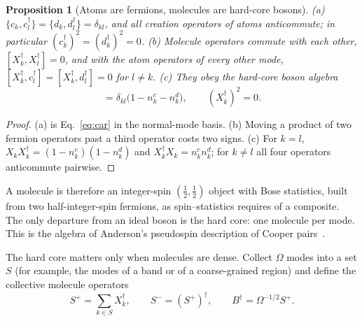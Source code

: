 \documentclass[reprint,aps,prd,amsmath,amssymb,superscriptaddress,nofootinbib,floatfix]{revtex4-2}
\theoremstyle{plain}
\newtheorem{proposition}{Proposition}
\theoremstyle{definition}
\theoremstyle{remark}
\newcommand{\Mol}{\ensuremath{X}}                 %
\begin{document}
\begin{proposition}[Atoms are fermions, molecules are hard-core bosons]
\label{prop:hardcore}
(a) $\{c_k,c^\dagger_l\}=\{d_k,d^\dagger_l\}=\delta_{kl}$, and all creation operators of atoms anticommute; in particular
$(c^\dagger_k)^2=(d^\dagger_k)^2=0$.
(b) Molecule operators commute with each other, $[\Mol^\dagger_k,\Mol^\dagger_l]=0$, and with the atom operators of every other
mode, $[\Mol^\dagger_k,c^\dagger_l]=[\Mol^\dagger_k,d^\dagger_l]=0$ for $l\neq k$.
(c) They obey the hard-core boson algebra
\begin{equation}
[\Mol_k,\Mol^\dagger_l]=\delta_{kl}\big(1-n^c_k-n^d_k\big),\qquad(\Mol^\dagger_k)^2=0 .
\label{eq:hardcore}
\end{equation}
\end{proposition}
\begin{proof}
(a) is Eq.~\eqref{eq:car} in the normal-mode basis. (b) Moving a product of two fermion operators past a third
operator costs two signs. (c) For $k=l$, $\Mol_k\Mol^\dagger_k=(1-n^c_k)(1-n^d_k)$ and $\Mol^\dagger_k\Mol_k=n^c_kn^d_k$; for $k\neq l$
all four operators anticommute pairwise.
\end{proof}
A molecule is therefore an integer-spin $(\tfrac12,\tfrac12)$ object with Bose statistics, built from two half-integer-spin
fermions, as spin--statistics requires of a composite. The only departure from an ideal boson is the hard core: one
molecule per mode. This is the algebra of Anderson's pseudospin description of Cooper pairs~\cite{Anderson1958}.

The hard core matters only when molecules are dense. Collect $\Omega$ modes into a set $S$ (for example, the modes of a
band or of a coarse-grained region) and define the collective molecule operators
\begin{equation}
S^+=\sum_{k\in S}\Mol^\dagger_k,\qquad S^-=(S^+)^\dagger,\qquad B^\dagger=\Omega^{-1/2}S^+ .
\label{eq:collective}
\end{equation}
\end{document}
